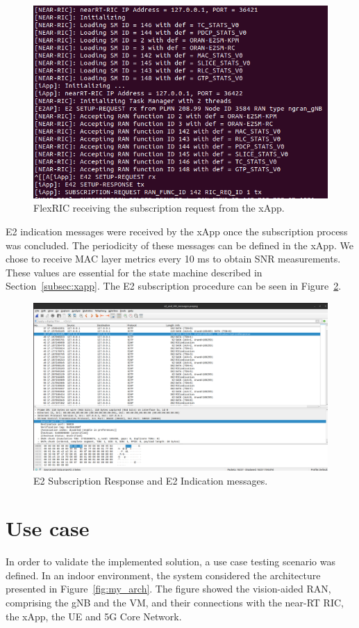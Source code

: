 \begin{figure}[H]
    \centering
    \includegraphics[width=0.5\linewidth]{figures/xapp_subscription}
    \caption{FlexRIC receiving the subscription request from the xApp.}
    \label{fig:xapp_subscription}
\end{figure}

E2 indication messages were received by the xApp once the subscription process was concluded.
The periodicity of these messages can be defined in the xApp.
We chose to receive MAC layer metrics every 10 ms to obtain SNR measurements.
These values are essential for the state machine described in Section~\ref{subsec:xapp}.
The E2 subscription procedure can be seen in Figure~\ref{fig:captura_e2ap}.

\begin{figure}[H]
    \centering
    \includegraphics[width=0.8\linewidth]{figures/ric_subs}
    \caption{E2 Subscription Response and E2 Indication messages.}
    \label{fig:captura_e2ap}
\end{figure}

\section{Use case}\label{sec:use_case}
In order to validate the implemented solution, a use case testing scenario was defined.
In an indoor environment, the system considered the architecture presented in Figure~\ref{fig:my_arch}.
The figure showed the vision-aided RAN, comprising the gNB and the VM, and their connections with the near-RT RIC, the xApp, the UE and 5G Core Network.

